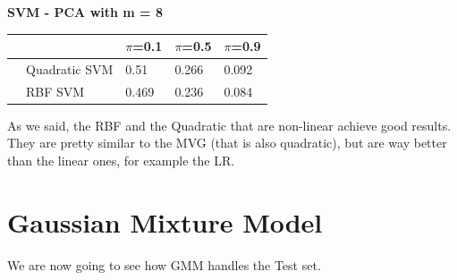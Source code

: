 \documentclass[english]{report}
\begin{document}
\textbf{SVM - PCA with m = 8}

\begin{table}[H]
    \centering
    \begin{tabular}{lllll}
        \hline
                                & & $\pi$=0.1 & $\pi$=0.5 & $\pi$=0.9 \\\hline
                                                        
                                & Quadratic SVM     & 0.51 & 0.266 & 0.092 \\
                                & RBF SVM           & 0.469  & 0.236 & 0.084\\    
        \hline
    \end{tabular}
    \label{tab:SVM_PCA8_eval}
\end{table}

As we said, the RBF and the Quadratic that are non-linear achieve good results.
They are pretty similar to the MVG (that is also quadratic), but are way better than the linear ones, for example the LR.

\newpage

\section{Gaussian Mixture Model}
We are now going to see how GMM handles the Test set.
\end{document}
